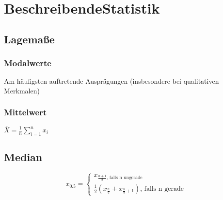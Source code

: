 \section{BeschreibendeStatistik}
  \subsection{Lagemaße}
    \subsubsection{Modalwerte}
    Am häufigsten auftretende Ausprägungen (insbesondere bei qualitativen Merkmalen)
    \subsubsection{Mittelwert}
    $\overline{X} = \frac{1}{n} \sum_{i=1}^{n} x_{i}$
    \subsection{Median}
    \begin{equation}
      x_{0.5} =
        \begin{cases}
        	x_{\frac{n+1}{2} \text{, falls n ungerade}}\\
        	\frac{1}{2}(x_{\frac{n}{2}} + x_{\frac{n}{2}+1}) \text{, falls n gerade}
        \end{cases}
    \end{equation}